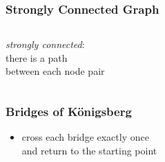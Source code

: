\documentclass[dvipsnames]{beamer}
\begin{document}
\begin{frame}
  \frametitle{Strongly Connected Graph}

  \begin{columns}
    \begin{definition}
      \emph{strongly connected}:\\
      there is a path\\
      between each node pair
    \end{definition}

    \begin{example}
      \begin{center}
      \end{center}
    \end{example}
  \end{columns}
\end{frame}
%
%
%

\begin{frame}
  \frametitle{Bridges of Königsberg}

  \begin{center}
  \end{center}

  \begin{itemize}
    \item cross each bridge exactly once\\
      and return to the starting point
  \end{itemize}
\end{frame}
\end{document}
